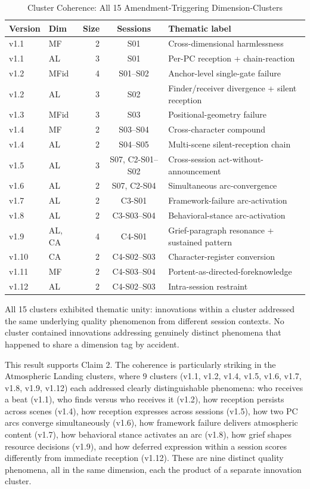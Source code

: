 \begin{table}[t]
\caption{Cluster Coherence: All 15 Amendment-Triggering Dimension-Clusters}
\label{tab:cluster-coherence}
\begin{tabular}{@{}llrcl@{}}
\toprule
Version & Dim & Size & Sessions & Thematic label \\
\midrule
v1.1 & MF  & 2 & S01       & Cross-dimensional harmlessness \\
v1.1 & AL  & 3 & S01       & Per-PC reception + chain-reaction \\
v1.2 & MFid & 4 & S01--S02 & Anchor-level single-gate failure \\
v1.2 & AL  & 3 & S02       & Finder/receiver divergence + silent reception \\
v1.3 & MFid & 3 & S03      & Positional-geometry failure \\
v1.4 & MF  & 2 & S03--S04  & Cross-character compound \\
v1.4 & AL  & 2 & S04--S05  & Multi-scene silent-reception chain \\
v1.5 & AL  & 3 & S07, C2-S01--S02 & Cross-session act-without-announcement \\
v1.6 & AL  & 2 & S07, C2-S04 & Simultaneous arc-convergence \\
v1.7 & AL  & 2 & C3-S01    & Framework-failure arc-activation \\
v1.8 & AL  & 2 & C3-S03--S04 & Behavioral-stance arc-activation \\
v1.9 & AL, CA & 4 & C4-S01 & Grief-paragraph resonance + sustained pattern \\
v1.10 & CA & 2 & C4-S02--S03 & Character-register conversion \\
v1.11 & MF & 2 & C4-S03--S04 & Portent-as-directed-foreknowledge \\
v1.12 & AL & 2 & C4-S02--S03 & Intra-session restraint \\
\bottomrule
\end{tabular}
\end{table}

All 15 clusters exhibited thematic unity: innovations within a cluster addressed
the same underlying quality phenomenon from different session contexts. No cluster
contained innovations addressing genuinely distinct phenomena that happened to
share a dimension tag by accident.

This result supports Claim 2. The coherence is particularly striking in the
Atmospheric Landing clusters, where 9 clusters (v1.1, v1.2, v1.4, v1.5, v1.6,
v1.7, v1.8, v1.9, v1.12) each addressed clearly distinguishable phenomena:
who receives a beat (v1.1), who finds versus who receives it (v1.2), how
reception persists across scenes (v1.4), how reception expresses across sessions
(v1.5), how two PC arcs converge simultaneously (v1.6), how framework failure
delivers atmospheric content (v1.7), how behavioral stance activates an arc
(v1.8), how grief shapes resource decisions (v1.9), and how deferred expression
within a session scores differently from immediate reception (v1.12). These are
nine distinct quality phenomena, all in the same dimension, each the product of
a separate innovation cluster.

